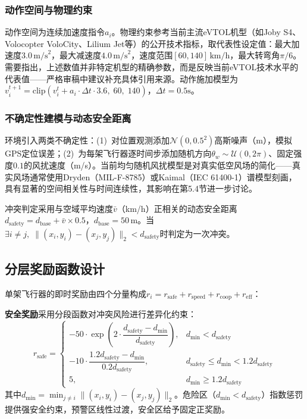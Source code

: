 \documentclass[12pt,a4paper,UTF8]{ctexart}
\begin{document}
\subsubsection{动作空间与物理约束}

动作空间为连续加速度指令$a_i$。物理约束参考当前主流eVTOL机型（如Joby S4、Volocopter VoloCity、Lilium Jet等）的公开技术指标，取代表性设定值：最大加速度$3.0\,\text{m/s}^2$，最大减速度$4.0\,\text{m/s}^2$，速度范围$[60, 140]\,\text{km/h}$，最大转弯角$\pi/6$。需要指出，上述数值并非特定机型的精确参数，而是反映当前eVTOL技术水平的代表值——严格审稿中建议补充具体引用来源。动作施加模型为$v_i^{t+1} = \text{clip}(v_i^{t} + a_i \cdot \Delta t \cdot 3.6,\; 60,\; 140)$，$\Delta t = 0.5\text{s}$。

\subsubsection{不确定性建模与动态安全距离}

环境引入两类不确定性：(1)~对位置观测添加$\mathcal{N}(0, 0.5^2)$高斯噪声（m），模拟GPS定位误差；(2)~为每架飞行器逐时间步添加随机方向$\theta_w \sim \mathcal{U}(0, 2\pi)$、固定强度$0.1$的风扰速度（m/s）。当前均匀随机风扰模型是对真实低空风场的简化——真实风场通常使用Dryden（MIL-F-8785）或Kaimal（IEC 61400-1）谱模型刻画，具有显著的空间相关性与时间连续性\cite{ref20}，其影响在第5.4节进一步讨论。

冲突判定采用与空域平均速度$\bar{v}$（km/h）正相关的动态安全距离$d_{\text{safety}} = d_{\text{base}} + \bar{v} \times 0.5$，$d_{\text{base}} = 50\,\text{m}$。当$\exists i \neq j,\; \|(x_i, y_i) - (x_j, y_j)\|_2 < d_{\text{safety}}$时判定为一次冲突。

\subsection{分层奖励函数设计}

单架飞行器的即时奖励由四个分量构成$r_i = r_{\text{safe}} + r_{\text{speed}} + r_{\text{coop}} + r_{\text{eff}}$：

\textbf{安全奖励}采用分段函数对冲突风险进行差异化约束：
\begin{equation}
    r_{\text{safe}} =
    \begin{cases}
        -50 \cdot \exp\left(2 \cdot \dfrac{d_{\text{safety}} - d_{\min}}{d_{\text{safety}}}\right), & d_{\min} < d_{\text{safety}} \\[10pt]
        -10 \cdot \dfrac{1.2d_{\text{safety}} - d_{\min}}{0.2d_{\text{safety}}}, & d_{\text{safety}} \leq d_{\min} < 1.2d_{\text{safety}} \\[10pt]
        5, & d_{\min} \geq 1.2d_{\text{safety}}
    \end{cases}
\end{equation}
其中$d_{\min} = \min_{j \neq i} \|(x_i, y_i) - (x_j, y_j)\|_2$。危险区（$d_{\min} < d_{\text{safety}}$）指数惩罚提供强安全约束，预警区线性过渡，安全区给予固定正奖励。
\end{document}
